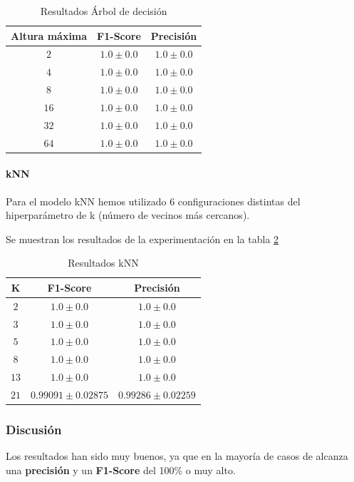 \documentclass[12pt]{article}
\begin{document}
\begin{table}[!ht]
	\caption{Resultados Árbol de decisión}
	\centering
		 \begin{tabular}{||c c c||}
			 \hline
			 Altura máxima & F1-Score & Precisión  \\ [0.5ex]
			 \hline\hline
			 $2$ & $1.0 \pm 0.0$ & $1.0 \pm 0.0$ \\
			 \hline
			 $4$ & $1.0 \pm 0.0$ & $1.0 \pm 0.0$ \\
			 \hline
			 $8$ & $1.0 \pm 0.0$ & $1.0 \pm 0.0$ \\
			 \hline
			 $16$ & $1.0 \pm 0.0$ & $1.0 \pm 0.0$ \\
			 \hline
			 $32$ & $1.0 \pm 0.0$ & $1.0 \pm 0.0$ \\
			 \hline
			 $64$ & $1.0 \pm 0.0$ & $1.0 \pm 0.0$ \\
			 \hline
		 \end{tabular}
	\label{Tab:DecisionTree_1}
\end{table}

\paragraph{kNN}
Para el modelo kNN hemos utilizado 6 configuraciones distintas del hiperparámetro de k (número de vecinos más cercanos).

Se muestran los resultados de la experimentación en la tabla \ref{Tab:kNN_1}

\begin{table}[!ht]
	\caption{Resultados kNN}
	\centering
		 \begin{tabular}{||c c c||}
			 \hline
			 K & F1-Score & Precisión  \\ [0.5ex]
			 \hline\hline
			 $2$ & $1.0 \pm 0.0$ & $1.0 \pm 0.0$ \\
			 \hline
			 $3$ & $1.0 \pm 0.0$ & $1.0 \pm 0.0$ \\
			 \hline
			 $5$ & $1.0 \pm 0.0$ & $1.0 \pm 0.0$ \\
			 \hline
			 $8$ & $1.0 \pm 0.0$ & $1.0 \pm 0.0$ \\
			 \hline
			 $13$ & $1.0 \pm 0.0$ & $1.0 \pm 0.0$ \\
			 \hline
			 $21$ & $0.99091 \pm 0.02875$ & $0.99286 \pm 0.02259$ \\
			 \hline
		 \end{tabular}
	\label{Tab:kNN_1}
\end{table}

\subsubsection{Discusión}
Los resultados han sido muy buenos, ya que en la mayoría de casos de alcanza una \textbf{precisión} y un \textbf{F1-Score} del 100\% o muy alto. 
\end{document}
